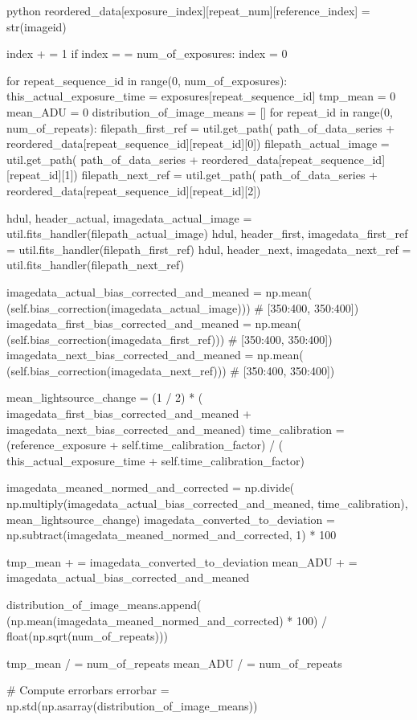 \documentclass[../main.tex]{subfiles}
\begin{document}
\begin{mintedbox}{python}
reordered_data[exposure_index][repeat_num][reference_index]  =  str(imageid)

index + =  1
if index  =  =  num_of_exposures:
index  =  0

for repeat_sequence_id in range(0, num_of_exposures):
this_actual_exposure_time  =  exposures[repeat_sequence_id]
tmp_mean  =  0
mean_ADU  =  0
distribution_of_image_means  =  []
for repeat_id in range(0, num_of_repeats):
filepath_first_ref  =  util.get_path(
path_of_data_series + reordered_data[repeat_sequence_id][repeat_id][0])
filepath_actual_image  =  util.get_path(
path_of_data_series + reordered_data[repeat_sequence_id][repeat_id][1])
filepath_next_ref  =  util.get_path(
path_of_data_series + reordered_data[repeat_sequence_id][repeat_id][2])

hdul, header_actual, imagedata_actual_image  =  util.fits_handler(filepath_actual_image)
hdul, header_first, imagedata_first_ref  =  util.fits_handler(filepath_first_ref)
hdul, header_next, imagedata_next_ref  =  util.fits_handler(filepath_next_ref)

imagedata_actual_bias_corrected_and_meaned  =  np.mean(
(self.bias_correction(imagedata_actual_image)))  # [350:400, 350:400])
imagedata_first_bias_corrected_and_meaned  =  np.mean(
(self.bias_correction(imagedata_first_ref)))  # [350:400, 350:400])
imagedata_next_bias_corrected_and_meaned  =  np.mean(
(self.bias_correction(imagedata_next_ref)))  # [350:400, 350:400])

mean_lightsource_change  =  (1 / 2) * (
imagedata_first_bias_corrected_and_meaned + imagedata_next_bias_corrected_and_meaned)
time_calibration  =  (reference_exposure + self.time_calibration_factor) / (
this_actual_exposure_time + self.time_calibration_factor)

imagedata_meaned_normed_and_corrected  =  np.divide(
np.multiply(imagedata_actual_bias_corrected_and_meaned, time_calibration), mean_lightsource_change)
imagedata_converted_to_deviation  =  np.subtract(imagedata_meaned_normed_and_corrected, 1) * 100

tmp_mean + =  imagedata_converted_to_deviation
mean_ADU + =  imagedata_actual_bias_corrected_and_meaned

distribution_of_image_means.append(
(np.mean(imagedata_meaned_normed_and_corrected) * 100) / float(np.sqrt(num_of_repeats)))

tmp_mean / =  num_of_repeats
mean_ADU / =  num_of_repeats

# Compute errorbars
errorbar  =  np.std(np.asarray(distribution_of_image_means))


\end{mintedbox}
\end{document}
